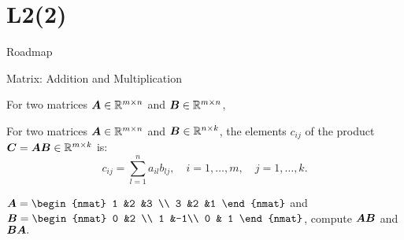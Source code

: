 \documentclass[handout,fleqn,aspectratio=169]{beamer}
\begin{document}
\section{L2(2)}
\begin{frame}{Roadmap}

\plitemsep 0.1in

\bce[(1)] 
\item {}

\item {}

\item {}
\ece
\end{frame}

\begin{frame}{Matrix: Addition and Multiplication}

\plitemsep 0.1in

\bci 
\item For two matrices $\bm{A} \in {\mathbb R}^{m \times n}$ and $\bm{B} \in {\mathbb R}^{m \times n}$, 

\item For two matrices $\bm{A} \in {\mathbb R}^{m \times n}$ and $\bm{B} \in {\mathbb R}^{n \times k}$, 
the elements $c_{ij}$ of the product $\bm{C} = \bm{A}\bm{B} \in {\mathbb R}^{m \times k}$ is:
$$
c_{ij} = \sum_{l=1}^n a_{il} b_{lj}, \quad i = 1, \ldots, m, \quad j = 1, \ldots, k.
$$

\item \exam 
$\mat{A} = 
\begin{nmat} 
 1 &2 &3 \\
 3  &2  &1
\end{nmat}
$ and 
$\mat{B} = 
\begin{nmat} 
 0 &2 \\
 1  &-1\\
 0  & 1
\end{nmat}
$, compute $\bm{AB}$ and $\bm{BA}.$
\eci
\end{frame}
\end{document}
